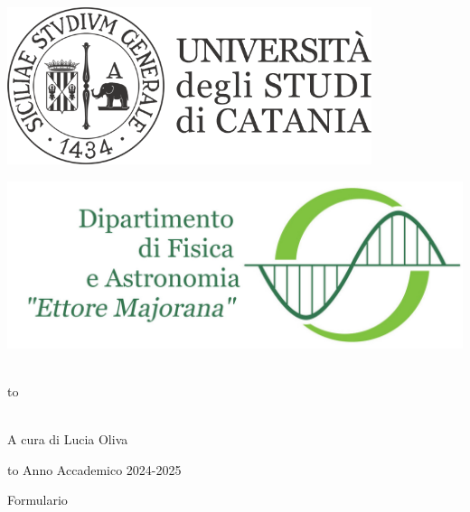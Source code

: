 \documentclass[openany,12pt]{article}
\newcommand\blankpage{%
    \null
    \thispagestyle{empty}%
    \newpage} %
\begin{document}
\thispagestyle{empty}
\begin{center}

\begin{minipage}[c]{0.45\textwidth}
\begin{flushleft}
\includegraphics[width=0.8\textwidth]{logo-unict-orizzontale-grigio.png}
\end{flushleft}
\end{minipage}
\hfill
\begin{minipage}[c]{0.45\textwidth}
\begin{flushright}
\includegraphics[width=\textwidth]{logo_dfa_orizzontale}
\end{flushright}
\end{minipage}\\
\medskip
\hbox to \textwidth{\hrulefill}

\vfill
\vfill

\uppercase{}\\

\vfill
\large{A cura di Lucia Oliva}

\vfill
\vfill
\hbox to \textwidth{\hrulefill}
{\sc Anno Accademico 2024-2025}
\end{center}

\afterpage{\blankpage}
\newpage


\newpage

{Formulario}
\end{document}
